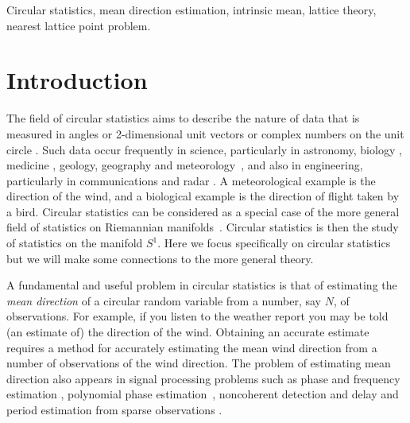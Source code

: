 \documentclass[journal]{../bib/IEEEtran}
\begin{document}
\begin{IEEEkeywords}
Circular statistics, mean direction estimation, intrinsic mean, lattice theory, nearest lattice point problem.
\end{IEEEkeywords}


\section{Introduction}\label{sec:introduction}

The field of circular statistics aims to describe the nature of data that is measured in angles or 2-dimensional unit vectors or complex numbers on the unit circle \cite{Mardia_directional_statistics,Jupp_mardia_unified_directional_statistics_1989,mardia_stat_dir_data_book_1975,Fisher1993,Jammalamadaka_dir_stat_book}.  Such data occur frequently in science, particularly in astronomy, biology \cite{batschelet1981circular,Cochranmigbridcalcircstat2004,Bolesspinylobnavcircstat2003}, medicine \cite{Mann_circstat_med_cement_2003,Lediseasecircstat2003}, geology, geography and meteorology~\cite{Fisher_bootstrap_geo_1_1990,Marida_geosciences_1981}, and also in engineering, particularly in communications and radar \cite{Fogel1989_bit_synch_zero_crossings,Elton96robustparameter1996,Clarkson2007,McKilliamLinearTimeBlockPSK2009,McKilliam2007}.  A meteorological example is the direction of the wind, and a biological example is the direction of flight taken by a bird. %
Circular statistics can be considered as a special case of the more general field of statistics on Riemannian manifolds~\cite{Bhattacharya_int_ext_means_2003,Bhattacharya_int_ext_means_2005,Pennec_int_st_rm_2006,bwhk07a}.  Circular statistics is then the study of statistics on the manifold $S^1$.  Here we focus specifically on circular statistics but we will make some connections to the more general theory.

A fundamental and useful problem in circular statistics is that of estimating the \emph{mean direction} of a circular random variable from a number, say $N$, of observations. For example, if you listen to the weather report you may be told (an estimate of) the direction of the wind.  Obtaining an accurate estimate requires a method for accurately estimating the mean wind direction from a number of observations of the wind direction. The problem of estimating mean direction also appears in signal processing problems such as phase and frequency estimation \cite{Quinn2009_dasp_phase_only_information_loss,Lovell1991,McKilliamFrequencyEstimationByPhaseUnwrapping2009,Quinn2001,McKilliam2010thesis}, polynomial phase estimation~\cite{McKilliam2009asilomar_polyest_lattice,McKilliam2010thesis,Kitchen_polyphase_unwrapping_1994}, noncoherent detection \cite{McKilliamLinearTimeBlockPSK2009,McKilliam2010thesis,Mackenthun1994} and delay and period estimation from sparse observations \cite{Elton96robustparameter1996,Clarkson2007,McKilliam2007,McKilliam2010thesis,Fogel1989_bit_synch_zero_crossings}. 
\end{document}
